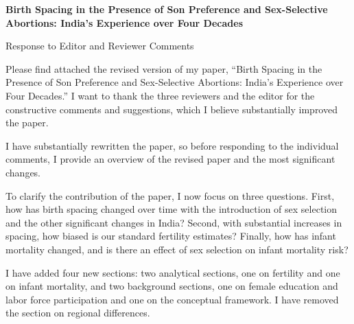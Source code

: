 \documentclass[letterpaper,12pt]{article}
\title{} \author{}
\begin{document}
\begin{center} \textbf{\large Birth Spacing in the Presence of Son
Preference and 
Sex-Selective Abortions: India's Experience over Four Decades}
\end{center}

\begin{center} Response to Editor and Reviewer Comments \end{center}

\noindent Please find attached the revised version of my paper,
``Birth Spacing in the Presence of Son Preference and Sex-Selective
Abortions:
India's Experience over Four Decades.''
I want to thank the three reviewers and the editor for the constructive comments and 
suggestions, which I believe substantially improved the paper.

I have substantially rewritten the paper, so before responding to the
individual comments, I provide an overview of the revised paper and the
most significant changes. 

To clarify the contribution of the paper, I now focus on three
questions. First, how has birth spacing changed over time with the
introduction of sex selection and the other significant changes in
India? Second, with substantial increases in spacing, how biased is our
standard fertility estimates? Finally, how has infant mortality changed,
and is there an effect of sex selection on infant mortality risk?

I have added four new sections: 
two analytical sections, one on fertility and one on infant mortality, 
and two background sections, one on female education and labor force 
participation and one on the conceptual framework.
I have removed the section on regional differences.
\end{document}
